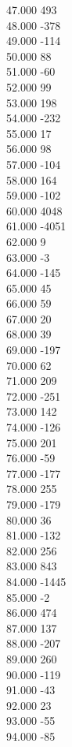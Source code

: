 { 47.000	493 \\
 48.000	-378 \\
 49.000	-114 \\
 50.000	88 \\
 51.000	-60 \\
 52.000	99 \\
 53.000	198 \\
 54.000	-232 \\
 55.000	17 \\
 56.000	98 \\
 57.000	-104 \\
 58.000	164 \\
 59.000	-102 \\
 60.000	4048 \\
 61.000	-4051 \\
 62.000	9 \\
 63.000	-3 \\
 64.000	-145 \\
 65.000	45 \\
 66.000	59 \\
 67.000	20 \\
 68.000	39 \\
 69.000	-197 \\
 70.000	62 \\
 71.000	209 \\
 72.000	-251 \\
 73.000	142 \\
 74.000	-126 \\
 75.000	201 \\
 76.000	-59 \\
 77.000	-177 \\
 78.000	255 \\
 79.000	-179 \\
 80.000	36 \\
 81.000	-132 \\
 82.000	256 \\
 83.000	843 \\
 84.000	-1445 \\
 85.000	-2 \\
 86.000	474 \\
 87.000	137 \\
 88.000	-207 \\
 89.000	260 \\
 90.000	-119 \\
 91.000	-43 \\
 92.000	23 \\
 93.000	-55 \\
 94.000	-85 \\
}
